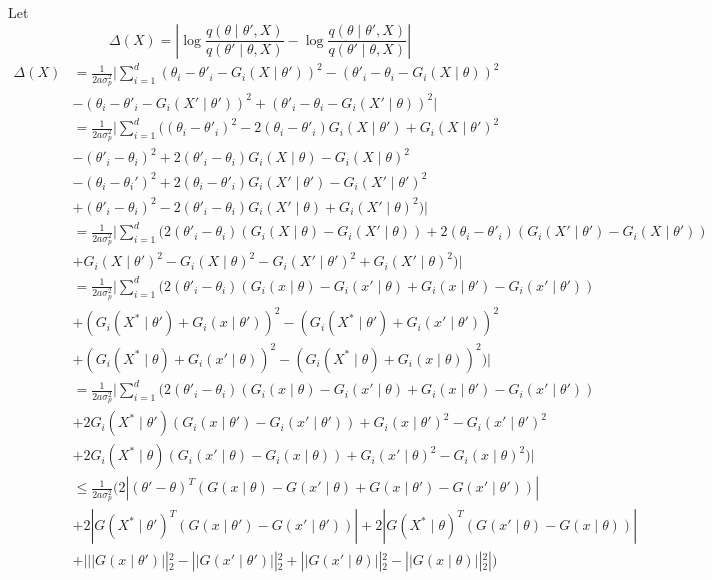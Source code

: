 \documentclass[english,twoside,openright]{HYgraduMLDS}
\begin{document}
Let 
\[
\Delta(X) = \left|\log \frac{q(\theta\mid \theta',X)}{q(\theta'\mid \theta,X)} 
- \log \frac{q(\theta\mid \theta',X)}{q(\theta'\mid \theta,X)}\right|
\]
\begin{align*}
    \Delta(X) 
    &=
    \frac{1}{2a\sigma_p^2}
    \Bigg|\sum_{i=1}^d (\theta_i - \theta'_i - G_i(X\mid \theta'))^2
    - (\theta'_i - \theta_i - G_i(X\mid \theta))^2
  \\&- (\theta_i - \theta'_i - G_i(X'\mid \theta'))^2
    + (\theta'_i - \theta_i - G_i(X'\mid \theta))^2\Bigg|
  \\&=
    \frac{1}{2a\sigma_p^2}
    \Bigg|\sum_{i=1}^d \Big(
    (\theta_i - \theta'_i)^2 - 2(\theta_i - \theta'_i)G_i(X\mid \theta')
    + G_i(X\mid \theta')^2
  \\&- (\theta'_i - \theta_i)^2 + 2(\theta'_i - \theta_i)G_i(X\mid \theta)
    - G_i(X\mid \theta)^2
  \\&- (\theta_i - \theta_i')^2 + 2(\theta_i - \theta'_i)G_i(X'\mid \theta')
    - G_i(X'\mid \theta')^2
  \\&+ (\theta'_i - \theta_i)^2 - 2(\theta'_i - \theta_i)G_i(X'\mid \theta)
    + G_i(X'\mid \theta)^2\Big)\Bigg|
  \\&=
    \frac{1}{2a\sigma_p^2}
    \Bigg|\sum_{i=1}^d \Big(
    2(\theta'_i - \theta_i)(G_i(X\mid \theta) - G_i(X'\mid \theta))
    + 2(\theta_i - \theta'_i)(G_i(X'\mid \theta') - G_i(X\mid \theta'))
  \\&+ G_i(X\mid \theta')^2
    - G_i(X\mid \theta)^2
    - G_i(X'\mid \theta')^2
    + G_i(X'\mid \theta)^2\Big)\Bigg|
  \\&=
    \frac{1}{2a\sigma_p^2}
    \Bigg|\sum_{i=1}^d \Big(
    2(\theta'_i - \theta_i)(G_i(x\mid \theta) - G_i(x'\mid \theta) 
    + G_i(x\mid \theta') - G_i(x'\mid \theta'))
  \\&+(G_i(X^*\mid \theta') + G_i(x\mid \theta'))^2
    - (G_i(X^*\mid \theta') + G_i(x'\mid \theta'))^2
  \\&+ (G_i(X^*\mid \theta) + G_i(x'\mid \theta))^2
    - (G_i(X^*\mid \theta) + G_i(x\mid \theta))^2\Big)\Bigg|
  \\&=
    \frac{1}{2a\sigma_p^2}
    \Bigg|\sum_{i=1}^d \Big(
    2(\theta'_i - \theta_i)(G_i(x\mid \theta) - G_i(x'\mid \theta) 
    + G_i(x\mid \theta') - G_i(x'\mid \theta'))
  \\&+ 2G_i(X^*\mid \theta')(G_i(x\mid \theta') - G_i(x'\mid \theta'))
  + G_i(x\mid \theta')^2 - G_i(x'\mid \theta')^2
  \\&+ 2G_i(X^*\mid \theta)(G_i(x'\mid \theta) - G_i(x\mid \theta))
  + G_i(x'\mid \theta)^2 - G_i(x\mid \theta)^2\Big)\Bigg|
  \\&\leq \frac{1}{2a\sigma_p^2}\Bigg(
  2\left|(\theta' - \theta)^T(G(x\mid \theta) - G(x'\mid \theta) 
  + G(x\mid \theta') - G(x'\mid \theta'))\right|
  \\&+ 2\left|G(X^*\mid \theta')^T(G(x\mid \theta') - G(x'\mid \theta'))\right|
  + 2\left|G(X^*\mid \theta)^T(G(x'\mid \theta) - G(x\mid \theta))\right|
  \\&+ |||G(x\mid \theta')||_2^2 - ||G(x'\mid \theta')||_2^2
  + ||G(x'\mid \theta)||_2^2 - ||G(x\mid \theta)||_2^2|
  \Bigg)
\end{align*}
\end{document}

